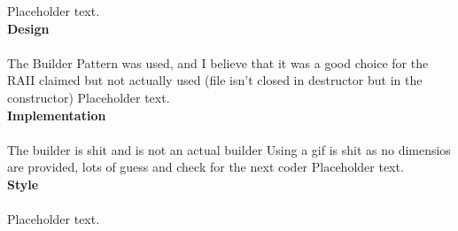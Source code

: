 \documentclass[12pt]{article}
\begin{document}
Placeholder text.\\

\textbf{Design}\\\\
The Builder Pattern was used, and I believe that it was a good choice for the
RAII claimed but not actually used (file isn't closed in destructor but in the constructor)
Placeholder text.\\

\textbf{Implementation}\\\\
The builder is shit and is not an actual builder
Using a gif is shit as no dimensios are provided, lots of guess and check for the next coder
Placeholder text.\\

\textbf{Style}\\\\
Placeholder text.\\
\end{document}
